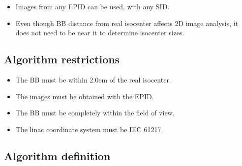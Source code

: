 \begin{itemize}
    \item Images from any EPID can be used, with any SID.
    \item Even though BB distance from real isocenter affects 2D image analysis, it does not need to be near it to determine isocenter sizes.
\end{itemize}

\subsection{Algorithm restrictions} \label{subsec:wlPylinacAlgorithmRestriction}

\begin{itemize}
    \item The BB must be within 2.0cm of the real isocenter.
    \item The images must be obtained with the EPID.
    \item The BB must be completely within the field of view.
    \item The linac coordinate system must be IEC 61217.
\end{itemize}

\subsection{Algorithm definition}

